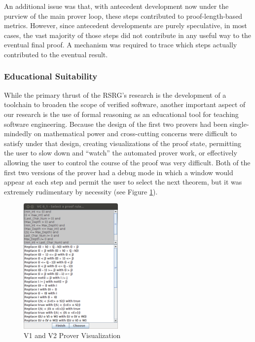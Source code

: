 An additional issue was that, with antecedent development now under the purview of the main prover loop, these steps contributed to proof-length-based metrics.  However, since antecedent developments are purely speculative, in most cases, the vast majority of those steps did not contribute in any useful way to the eventual final proof.  A mechanism was required to trace which steps actually contributed to the eventual result.

		\subsubsection{Educational Suitability}	%

While the primary thrust of the RSRG's research is the development of a toolchain to broaden the scope of verified software, another important aspect of our research is the use of formal reasoning as an educational tool for teaching software engineering.  Because the design of the first two provers had been single-mindedly on mathematical power and cross-cutting concerns were difficult to satisfy under that design, creating visualizations of the proof state, permitting the user to slow down and ``watch'' the automated prover work, or effectively allowing the user to control the course of the proof was very difficult.  Both of the first two versions of the prover had a debug mode in which a window would appear at each step and permit the user to select the next theorem, but it was extremely rudimentary by necessity (see Figure \ref{proverDebugMode}).

\begin{figure}
  \centering
    \includegraphics[width=0.45\textwidth]{proverDebugMode}
  \caption{V1 and V2 Prover Visualization\label{proverDebugMode}}
\end{figure}

